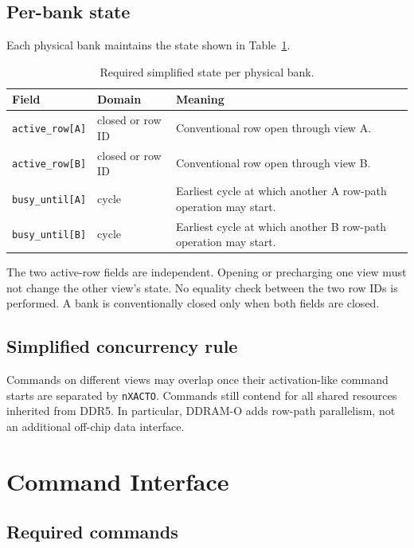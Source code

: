 \documentclass[9pt,twocolumn]{extarticle}
\newcommand{\cmd}[1]{\texttt{#1}}
\newcommand{\param}[1]{\texttt{#1}}
\newcommand{\viewA}{\textsf{A}}
\newcommand{\viewB}{\textsf{B}}
\begin{document}
\subsection{Per-bank state}

Each physical bank maintains the state shown in Table~\ref{tab:state}.

\begin{table}[ht]
\centering
\caption{Required simplified state per physical bank.}
\label{tab:state}
\begin{tabularx}{\columnwidth}{@{}l l X@{}}
\toprule
Field & Domain & Meaning \\
\midrule
\cmd{active\_row[A]} & closed or row ID & Conventional row open through view \viewA{}. \\
\cmd{active\_row[B]} & closed or row ID & Conventional row open through view \viewB{}. \\
\cmd{busy\_until[A]} & cycle & Earliest cycle at which another \viewA{} row-path operation may start. \\
\cmd{busy\_until[B]} & cycle & Earliest cycle at which another \viewB{} row-path operation may start. \\
\bottomrule
\end{tabularx}
\end{table}

The two active-row fields are independent. Opening or precharging one view must
not change the other view's state. No equality check between the two row IDs is
performed. A bank is conventionally closed only when both fields are closed.

\subsection{Simplified concurrency rule}

Commands on different views may overlap once their activation-like command
starts are separated by \param{nXACTO}. Commands still contend for all shared
resources inherited from DDR5. In particular, DDRAM-O adds row-path
parallelism, not an additional off-chip data interface.

\section{Command Interface}

\subsection{Required commands}
\end{document}
